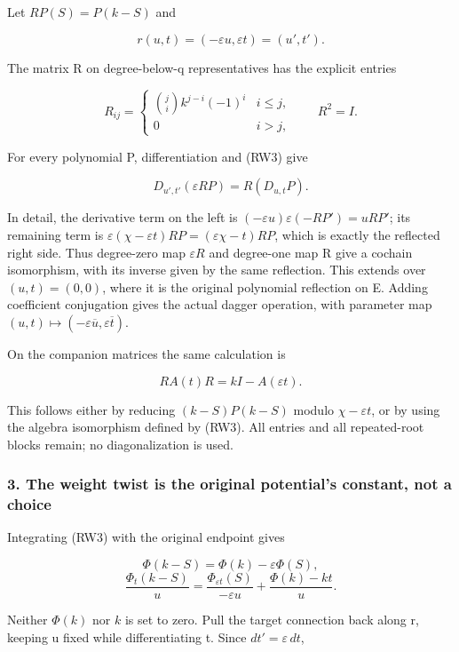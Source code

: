 Let \(RP(S)=P(k-S)\) and

\[
r(u,t)=(-\varepsilon u,\varepsilon t)=(u',t').
\tag{RW6}
\]

The matrix R on degree-below-q representatives has the explicit entries

\[
R_{ij}=\begin{cases}\binom ji k^{j-i}(-1)^i&i\le j,\\0&i>j,
\end{cases}\qquad R^2=I.
\tag{RW7}
\]

For every polynomial P, differentiation and (RW3) give

\[
D_{u',t'}(\varepsilon RP)=R(D_{u,t}P).
\tag{RW8}
\]

In detail, the derivative term on the left is \((-\varepsilon u)\varepsilon(-RP')=uRP'\); its remaining term is \(\varepsilon(\chi-\varepsilon t)RP=(\varepsilon\chi-t)RP\), which is exactly the reflected right side. Thus degree-zero map \(\varepsilon R\) and degree-one map R give a cochain isomorphism, with its inverse given by the same reflection. This extends over \((u,t)=(0,0)\), where it is the original polynomial reflection on E. Adding coefficient conjugation gives the actual dagger operation, with parameter map \((u,t)\mapsto(-\varepsilon\overline u,\varepsilon\overline t)\).

On the companion matrices the same calculation is

\[
R A(t)R=kI-A(\varepsilon t).
\tag{RW9}
\]

This follows either by reducing \((k-S)P(k-S)\) modulo \(\chi-\varepsilon t\), or by using the algebra isomorphism defined by (RW3). All entries and all repeated-root blocks remain; no diagonalization is used.

\subsubsection{3. The weight twist is the original potential's constant, not a choice}\label{endpoint-f1_reflection--the-weight-twist-is-the-original-potentials-constant-not-a-choice}

Integrating (RW3) with the original endpoint gives

\[
\Phi(k-S)=\Phi(k)-\varepsilon\Phi(S),
\] \[
\boxed{\frac{\Phi_t(k-S)}u
=\frac{\Phi_{\varepsilon t}(S)}{-\varepsilon u}
 +\frac{\Phi(k)-kt}{u}.}
\tag{RW10}
\]

Neither \(\Phi(k)\) nor \(k\) is set to zero. Pull the target connection back along r, keeping u fixed while differentiating t. Since \(dt'=\varepsilon\,dt\),

